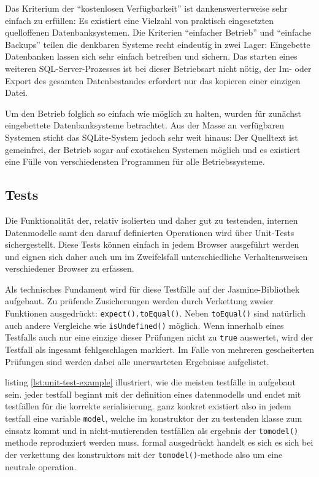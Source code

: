 Das Kriterium der ``kostenlosen Verfügbarkeit'' ist dankenswerterweise sehr einfach zu erfüllen: Es existiert eine Vielzahl von praktisch eingesetzten quelloffenen Datenbanksystemen. Die Kriterien ``einfacher Betrieb'' und ``einfache Backups'' teilen die denkbaren Systeme recht eindeutig in zwei Lager: Eingebette Datenbanken lassen sich sehr einfach betreiben und sichern. Das starten eines weiteren SQL-Server-Prozesses ist bei dieser Betriebsart nicht nötig, der Im- oder Export des gesamten Datenbestandes erfordert nur das kopieren einer einzigen Datei.

Um den Betrieb folglich so einfach wie möglich zu halten, wurden für \idename zunächst eingebettete Datenbanksysteme betrachtet. Aus der Masse an verfügbaren Systemen sticht das SQLite-System jedoch sehr weit hinaus: Der Quelltext ist gemeinfrei, der Betrieb sogar auf exotischen Systemen möglich und es existiert eine Fülle von verschiedensten Programmen für alle Betriebssysteme.


\subsection{Tests}

Die Funktionalität der, relativ isolierten und daher gut zu testenden, internen Datenmodelle samt den darauf definierten Operationen wird über Unit-Tests sichergestellt. Diese Tests können einfach in jedem Browser ausgeführt werden und eignen sich daher auch um im Zweifelsfall unterschiedliche Verhaltensweisen verschiedener Browser zu erfassen.

Als technisches Fundament wird für diese Testfälle auf der Jasmine-Bibliothek aufgebaut. Zu prüfende Zusicherungen werden durch Verkettung zweier Funktionen ausgedrückt: \lstinline{expect().toEqual()}. Neben \lstinline{toEqual()} sind natürlich auch andere Vergleiche wie \lstinline{isUndefined()} möglich. Wenn innerhalb eines Testfalls auch nur eine einzige dieser Prüfungen nicht zu \lstinline{true} auswertet, wird der Testfall als ingesamt fehlgeschlagen markiert. Im Falle von mehreren gescheiterten Prüfungen sind werden dabei alle unerwarteten Ergebnisse aufgelistet.

listing \ref{lst:unit-test-example} illustriert, wie die meisten testfälle in \idename aufgebaut sein. jeder testfall beginnt mit der definition eines datenmodells und endet mit testfällen für die korrekte serialisierung. ganz konkret existiert also in jedem testfall eine variable \lstinline{model}, welche im konstruktor der zu testenden klasse zum einsatz kommt und in nicht-mutierenden testfällen als ergebnis der \lstinline{tomodel()} methode reproduziert werden muss. formal ausgedrückt handelt es sich es sich bei der verkettung des konstruktors mit der \lstinline{tomodel()}-methode also um eine neutrale operation.

